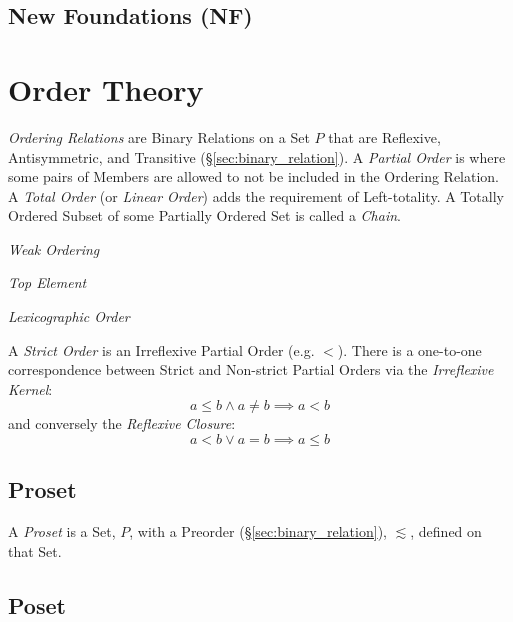 \subsection{New Foundations (NF)}\label{sec:quine_foundations}



\section{Order Theory}\label{sec:order_theory}

\emph{Ordering Relations} are Binary Relations on a Set $P$ that are
Reflexive, Antisymmetric, and Transitive
(\S\ref{sec:binary_relation}). A \emph{Partial Order} is where some
pairs of Members are allowed to not be included in the Ordering
Relation. A \emph{Total Order} (or \emph{Linear Order}) adds the
requirement of Left-totality. A Totally Ordered Subset of some
Partially Ordered Set is called a \emph{Chain}.

\emph{Weak Ordering}

\emph{Top Element}

\emph{Lexicographic Order}

A \emph{Strict Order} is an Irreflexive Partial Order (e.g. $<$).
There is a one-to-one correspondence between Strict and Non-strict
Partial Orders via the \emph{Irreflexive Kernel}:
\[
    a \leq b \wedge a \neq b \implies a < b
\]
and conversely the \emph{Reflexive Closure}:
\[
    a < b \vee a = b \implies a \leq b
\]



\subsection{Proset}\label{sec:proset}

A \emph{Proset} is a Set, $P$, with a Preorder
(\S\ref{sec:binary_relation}), $\lesssim$, defined on that Set.



\subsection{Poset}\label{sec:poset}

